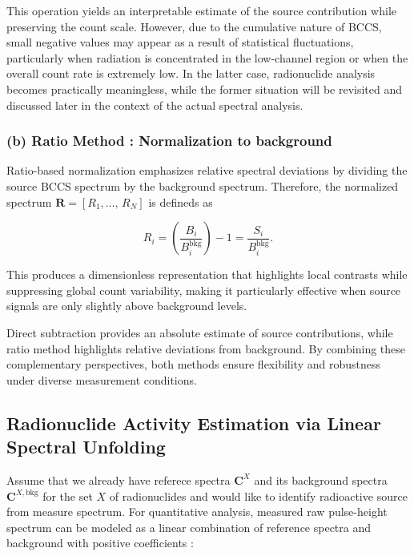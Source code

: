 \documentclass[10pt]{wlscirep}
\begin{document}
This operation yields an interpretable estimate of the source contribution while preserving the count scale. However, due to the cumulative nature of BCCS, small negative values may appear as a result of statistical fluctuations, particularly when radiation is concentrated in the low-channel region or when the overall count rate is extremely low. In the latter case, radionuclide analysis becomes practically meaningless, while the former situation will be revisited and discussed later in the context of the actual spectral analysis. 


\subsubsection*{(b) Ratio Method : Normalization to background} 

Ratio-based normalization emphasizes relative spectral deviations by dividing the source BCCS spectrum by the background spectrum. Therefore, the normalized spectrum $\mathbf{R}=[R_1,\ldots,\,R_N]$ is defineds as

\begin{equation}
R_i = \left(\dfrac{B_i}{B^{\textrm{bkg}}_i}\right) -1=\dfrac{S_i}{B_i^{\text{bkg}}}.
\end{equation}

This produces a dimensionless representation that highlights local contrasts while suppressing global count variability, making it particularly effective when source signals are only slightly above background levels.


Direct subtraction provides an absolute estimate of source contributions, while ratio method highlights relative deviations from background. By combining these complementary perspectives, both methods ensure flexibility and robustness under diverse measurement conditions.

\subsection*{Radionuclide Activity Estimation via Linear Spectral Unfolding}

Assume that we already have referece spectra $\textbf{C}^X$ and its background spectra $\textbf{C}^{X,\text{bkg}}$ for the set $X$ of radionuclides and would like to identify radioactive source from measure spectrum. For quantitative analysis, measured raw pulse-height spectrum can be modeled as a linear combination of reference spectra and background with positive coefficients :
\end{document}
